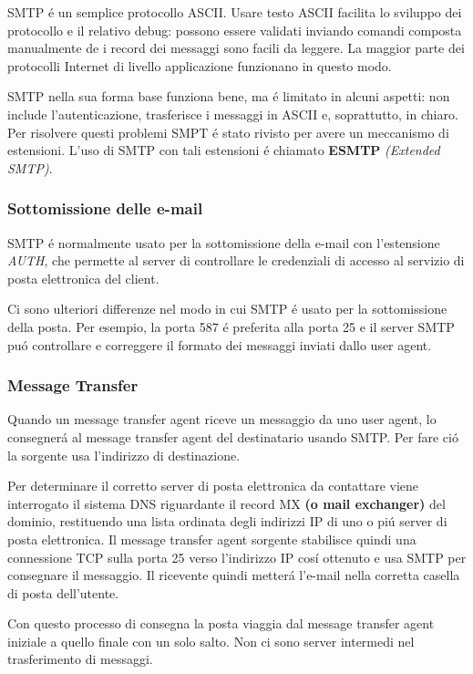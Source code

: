 \documentclass[12pt]{article}
\begin{document}
SMTP \'e un semplice protocollo ASCII. Usare testo ASCII facilita lo sviluppo dei protocollo e il relativo debug: possono essere 
validati inviando comandi composta manualmente de i record dei messaggi sono facili da leggere. La maggior parte dei protocolli 
Internet di livello applicazione funzionano in questo modo.

SMTP nella sua forma base funziona bene, ma \'e limitato in alcuni aspetti: non include l'autenticazione, trasferisce i messaggi in 
ASCII e, soprattutto, in chiaro. Per risolvere questi problemi SMPT \'e stato rivisto per avere un meccanismo di estensioni. L'uso di 
SMTP con tali estensioni \'e chiamato \textbf{ESMTP} \textit{(Extended SMTP)}.

\subsubsection{Sottomissione delle e-mail}\label{posta-elettronica-sottomissione-delle-email}
SMTP \'e normalmente usato per la sottomissione della e-mail con l'estensione \textit{AUTH}, che permette al server di controllare le 
credenziali di accesso al servizio di posta elettronica del client.

Ci sono ulteriori differenze nel modo in cui SMTP \'e usato per la sottomissione della posta. Per esempio, la porta 587 \'e preferita 
alla porta 25 e il server SMTP pu\'o controllare e correggere il formato dei messaggi inviati dallo user agent.

\subsubsection{Message Transfer}\label{posta-elettronica-message-transfer}
Quando un message transfer agent riceve un messaggio da uno user agent, lo consegner\'a al message transfer agent del destinatario 
usando SMTP. Per fare ci\'o la sorgente usa l'indirizzo di destinazione.

Per determinare il corretto server di posta elettronica da contattare viene interrogato il sistema DNS riguardante il record MX 
\textbf{(o mail exchanger)} del dominio, restituendo una lista ordinata degli indirizzi IP di uno o pi\'u server di posta 
elettronica. Il message transfer agent sorgente stabilisce quindi una connessione TCP sulla porta 25 verso l'indirizzo IP cos\'i 
ottenuto e usa SMTP per consegnare il messaggio. Il ricevente quindi metter\'a l'e-mail nella corretta casella di posta dell'utente.

Con questo processo di consegna la posta viaggia dal message transfer agent iniziale a quello finale con un solo salto. Non ci sono 
server intermedi nel trasferimento di messaggi.
\end{document}
